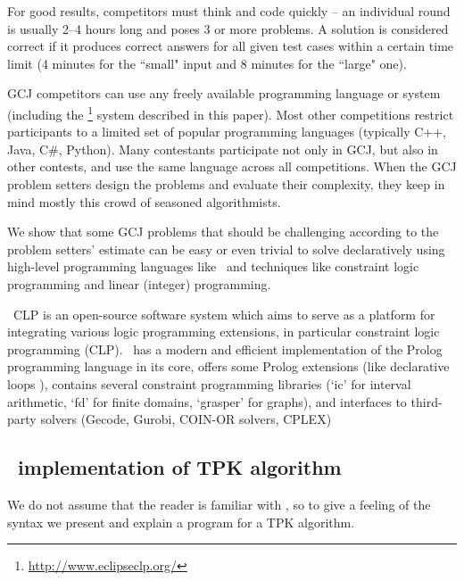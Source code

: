 \documentclass{acm_proc_article-sp}
\begin{document}
For good results, competitors must think and code quickly -- an individual round is usually 2--4 hours long and poses 3 or more problems. 
A solution is considered correct if it produces correct answers for all given test cases within a certain time limit 
(4 minutes for the ``small" input and 8 minutes for the ``large" one).

GCJ competitors can use any freely available programming language or system (including the \eclipse\footnote{\url{http://www.eclipseclp.org/}} system described in this paper). 
Most other competitions restrict participants to a limited set of popular programming languages (typically C++, Java, C\#, Python).
Many contestants participate not only in GCJ, but also in other contests, and use the same language across all competitions.
When the GCJ problem setters design the problems and evaluate their complexity, they keep in mind mostly this crowd of seasoned algorithmists. 

We show that some GCJ problems that should be challenging according to the problem setters' estimate 
can be easy or even trivial to 
solve declaratively using high-level programming languages like \eclipse\ and techniques like constraint logic programming and linear (integer) programming.

\eclipse\ CLP\cite{schimpf2012eclipse,apt2007constraint}
is an open-source software system which aims to serve as a platform for integrating various logic programming extensions, in particular constraint logic programming (CLP).
\eclipse\ has a modern and efficient implementation of the Prolog programming language in its core, offers some Prolog extensions (like declarative loops \cite{schimpf2002loops}),
contains several constraint programming libraries (`ic' for interval arithmetic, `fd' for finite domains, `grasper' for graphs), and
interfaces to third-party solvers (Gecode, Gurobi, COIN-OR solvers, CPLEX) \cite{eclipse-library-manual}

\subsection*{\eclipse\ implementation of TPK algorithm}

We do not assume that the reader is familiar with \eclipse, so to give a feeling of the syntax we present and explain a program for a TPK algorithm.
\end{document}
